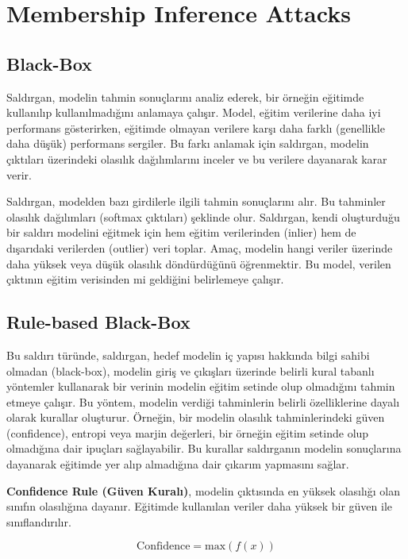 \section{Membership Inference Attacks}

\subsection{Black-Box}

Saldırgan, modelin tahmin sonuçlarını analiz ederek, bir örneğin eğitimde kullanılıp kullanılmadığını anlamaya çalışır. Model, eğitim verilerine daha iyi performans gösterirken, eğitimde olmayan verilere karşı daha farklı (genellikle daha düşük) performans sergiler. Bu farkı anlamak için saldırgan, modelin çıktıları üzerindeki olasılık dağılımlarını inceler ve bu verilere dayanarak karar verir.

Saldırgan, modelden bazı girdilerle ilgili tahmin sonuçlarını alır. Bu tahminler olasılık dağılımları (softmax çıktıları) şeklinde olur. Saldırgan, kendi oluşturduğu bir saldırı modelini eğitmek için hem eğitim verilerinden (inlier) hem de dışarıdaki verilerden (outlier) veri toplar. Amaç, modelin hangi veriler üzerinde daha yüksek veya düşük olasılık döndürdüğünü öğrenmektir. Bu model, verilen çıktının eğitim verisinden mi geldiğini belirlemeye çalışır.

\newpage

\subsection{Rule-based Black-Box}

Bu saldırı türünde, saldırgan, hedef modelin iç yapısı hakkında bilgi sahibi olmadan (black-box), modelin giriş ve çıkışları üzerinde belirli kural tabanlı yöntemler kullanarak bir verinin modelin eğitim setinde olup olmadığını tahmin etmeye çalışır. Bu yöntem, modelin verdiği tahminlerin belirli özelliklerine dayalı olarak kurallar oluşturur. Örneğin, bir modelin olasılık tahminlerindeki güven (confidence), entropi veya marjin değerleri, bir örneğin eğitim setinde olup olmadığına dair ipuçları sağlayabilir. Bu kurallar saldırganın modelin sonuçlarına dayanarak eğitimde yer alıp almadığına dair çıkarım yapmasını sağlar.

\textbf{Confidence Rule (Güven Kuralı)}, modelin çıktısında en yüksek olasılığı olan sınıfın olasılığına dayanır. Eğitimde kullanılan veriler daha yüksek bir güven ile sınıflandırılır.

\[ \text{Confidence} = \text{max}(f(x)) \]

